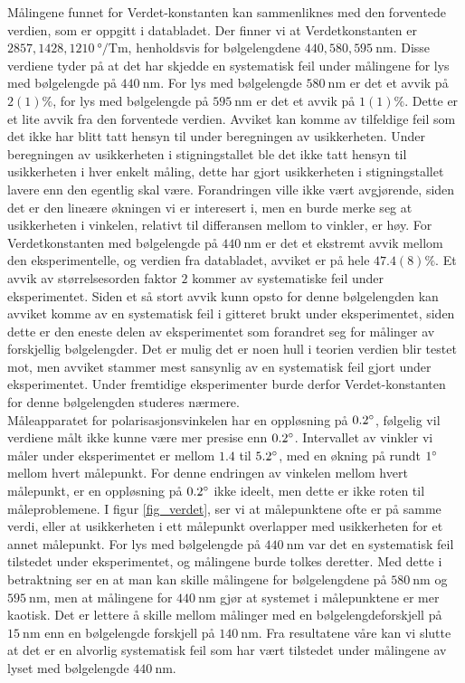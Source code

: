 \documentclass[%
 reprint,
 amsmath,amssymb,
 aps,
 norsk,
]{revtex4-1}
\begin{document}
Målingene funnet for Verdet-konstanten kan sammenliknes med den forventede verdien, som er oppgitt i databladet. Der finner vi at Verdetkonstanten er $2857, 1428, \SI{1210}{\degree/\tesla\meter}$, henholdsvis for bølgelengdene $440, 580, \SI{595}{\nano\meter}$. Disse verdiene tyder på at det har skjedde en systematisk feil under målingene for lys med bølgelengde på $\SI{440}{\nano\meter}$. For lys med bølgelengde $\SI{580}{\nano\meter}$ er det et avvik på $2(1)\%$, for lys med bølgelengde på $\SI{595}{\nano\meter}$ er det et avvik på $1(1)\%$. Dette er et lite avvik fra den forventede verdien. Avviket kan komme av tilfeldige feil som det ikke har blitt tatt hensyn til under beregningen av usikkerheten. Under beregningen av usikkerheten i stigningstallet ble det ikke tatt hensyn til usikkerheten i hver enkelt måling, dette har gjort usikkerheten i stigningstallet lavere enn den egentlig skal være. Forandringen ville ikke vært avgjørende, siden det er den lineære økningen vi er interesert i, men en burde merke seg at usikkerheten i vinkelen, relativt til differansen mellom to vinkler, er høy.
For Verdetkonstanten med bølgelengde på $\SI{440}{\nano\meter}$ er det et ekstremt avvik mellom den eksperimentelle, og verdien fra databladet, avviket er på hele $47.4(8)\%$. Et avvik av størrelsesorden faktor $2$ kommer av systematiske feil under eksperimentet. Siden et så stort avvik kunn opsto for denne bølgelengden kan avviket komme av en systematisk feil i gitteret brukt under eksperimentet, siden dette er den eneste delen av eksperimentet som forandret seg for målinger av forskjellig bølgelengder. Det er mulig det er noen hull i teorien verdien blir testet mot, men avviket stammer mest sansynlig av en systematisk feil gjort under eksperimentet. Under fremtidige eksperimenter burde derfor Verdet-konstanten for denne bølgelengden studeres nærmere.\\
Måleapparatet for polarisasjonsvinkelen har en oppløsning på $0.2\degree$, følgelig vil verdiene målt ikke kunne være mer presise enn $0.2\degree$. Intervallet av vinkler vi måler under eksperimentet er mellom $1.4$ til $5.2\degree$, med en økning på rundt $1\degree$ mellom hvert målepunkt. For denne endringen av vinkelen mellom hvert målepunkt, er en oppløsning på $0.2\degree$ ikke ideelt, men dette er ikke roten til måleproblemene.
I figur \vref{fig_verdet}, ser vi at målepunktene ofte er på samme verdi, eller at usikkerheten i ett målepunkt overlapper med usikkerheten for et annet målepunkt. For lys med bølgelengde på $\SI{440}{\nano\meter}$ var det en systematisk feil tilstedet under eksperimentet, og målingene burde tolkes deretter. Med dette i betraktning ser en at man kan skille målingene for bølgelengdene på $\SI{580}{\nano\meter}$ og $\SI{595}{\nano\meter}$, men at målingene for $\SI{440}{\nano\meter}$ gjør at systemet i målepunktene er mer kaotisk. Det er lettere å skille mellom målinger med en bølgelengdeforskjell på $\SI{15}{\nano\meter}$ enn en bølgelengde forskjell på $\SI{140}{\nano\meter}$.
Fra resultatene våre kan vi slutte at det er en alvorlig systematisk feil som har vært tilstedet under målingene av lyset med bølgelengde $\SI{440}{\nano\meter}$.
\end{document}
